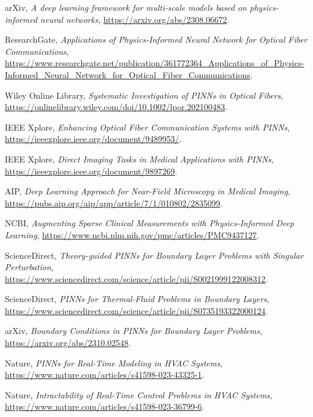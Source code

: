 \documentclass[12pt]{article}
\begin{document}
\begin{thebibliography}{9}
		arXiv,
		\textit{A deep learning framework for multi-scale models based on physics-informed neural networks}, \url{https://arxiv.org/abs/2308.06672}.
				
		ResearchGate,
		\textit{Applications of Physics-Informed Neural Network for Optical Fiber Communications},
		\url{https://www.researchgate.net/publication/361772364_Applications_of_Physics-Informed_Neural_Network_for_Optical_Fiber_Communications}.
		
		Wiley Online Library,
		\textit{Systematic Investigation of PINNs in Optical Fibers},
		\url{https://onlinelibrary.wiley.com/doi/10.1002/lpor.202100483}.
		
		IEEE Xplore,
		\textit{Enhancing Optical Fiber Communication Systems with PINNs},
		\url{https://ieeexplore.ieee.org/document/9489953/}.
		
		IEEE Xplore,
		\textit{Direct Imaging Tasks in Medical Applications with PINNs},
		\url{https://ieeexplore.ieee.org/document/9897269}.
		
		AIP,
		\textit{Deep Learning Approach for Near-Field Microscopy in Medical Imaging},
		\url{https://pubs.aip.org/aip/app/article/7/1/010802/2835099}.
		
		NCBI,
		\textit{Augmenting Sparse Clinical Measurements with Physics-Informed Deep Learning},
		\url{https://www.ncbi.nlm.nih.gov/pmc/articles/PMC9437127}.
		
		ScienceDirect,
		\textit{Theory-guided PINNs for Boundary Layer Problems with Singular Perturbation},
		\url{https://www.sciencedirect.com/science/article/pii/S0021999122008312}.
		
		ScienceDirect,
		\textit{PINNs for Thermal-Fluid Problems in Boundary Layers},
		\url{https://www.sciencedirect.com/science/article/pii/S0735193322000124}.
		
		arXiv,
		\textit{Boundary Conditions in PINNs for Boundary Layer Problems},
		\url{https://arxiv.org/abs/2310.02548}.
		
		Nature,
		\textit{PINNs for Real-Time Modeling in HVAC Systems},
		\url{https://www.nature.com/articles/s41598-023-43325-1}.
		
		Nature,
		\textit{Intractability of Real-Time Control Problems in HVAC Systems},
		\url{https://www.nature.com/articles/s41598-023-36799-6}.
		

\end{thebibliography}
\end{document}
